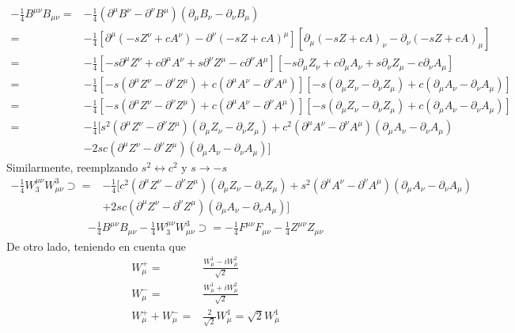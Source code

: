\begin{itemize}
\begin{align}
  -\tfrac{1}{4}B^{\mu\nu}B_{\mu\nu}=&-\tfrac{1}{4}(\partial^\mu B^\nu-\partial^\nu B^\mu)(\partial_\mu B_\nu-\partial_\nu B_\mu)\nonumber\\
=&-\tfrac{1}{4}[\partial^\mu (-s Z^\nu+ c A^\nu)-\partial^\nu (-s Z+ c A)^\mu][\partial_\mu (-s Z+ c A)_\nu-\partial_\nu (-s Z+ c A)_\mu]\nonumber\\
=&-\tfrac{1}{4}[-s\partial^\mu Z^\nu +c\partial^\mu A^\nu+s\partial^\nu Z^\mu-c\partial^\nu A^\mu][-s\partial_\mu Z_\nu +c\partial_\mu A_\nu+s\partial_\nu Z_\mu-c\partial_\nu A_\mu]\nonumber\\
=&-\tfrac{1}{4}[-s(\partial^\mu Z^\nu-\partial^\nu Z^\mu)+c(\partial^\mu A^\nu-\partial^\nu A^\mu)][-s(\partial_\mu Z_\nu-\partial_\nu Z_\mu)+c(\partial_\mu A_\nu-\partial_\nu A_\mu)]\nonumber\\
  =&-\tfrac{1}{4}[-s(\partial^\mu Z^\nu-\partial^\nu Z^\mu)+c(\partial^\mu A^\nu-\partial^\nu A^\mu)][-s(\partial_\mu Z_\nu-\partial_\nu Z_\mu)+c(\partial_\mu A_\nu-\partial_\nu A_\mu)]\nonumber\\
=&-\tfrac{1}{4}[s^2(\partial^\mu Z^\nu-\partial^\nu Z^\mu)(\partial_\mu Z_\nu-\partial_\nu Z_\mu)+c^2(\partial^\mu A^\nu-\partial^\nu A^\mu)(\partial_\mu A_\nu-\partial_\nu A_\mu)\nonumber\\
&  -2s c(\partial^\mu Z^\nu-\partial^\nu Z^\mu)(\partial_\mu A_\nu-\partial_\nu A_\mu)]
\end{align}
Similarmente, reemplzando $s^2\leftrightarrow c^2$ y $s\to-s$
\begin{align}
-\tfrac{1}{4}W^{\mu\nu}_3W_{\mu\nu}^3\supset=&-\tfrac{1}{4}[c^2(\partial^\mu Z^\nu-\partial^\nu Z^\mu)(\partial_\mu Z_\nu-\partial_\nu Z_\mu)+s^2(\partial^\mu A^\nu-\partial^\nu A^\mu)(\partial_\mu A_\nu-\partial_\nu A_\mu)\nonumber\\
&  +2s c(\partial^\mu Z^\nu-\partial^\nu Z^\mu)(\partial_\mu A_\nu-\partial_\nu A_\mu)]
\end{align}
\begin{align}
  -\tfrac{1}{4}B^{\mu\nu}B_{\mu\nu}-\tfrac{1}{4}W^{\mu\nu}_3W_{\mu\nu}^3\supset=-\tfrac{1}{4}F^{\mu\nu}F_{\mu\nu}-\tfrac{1}{4}Z^{\mu\nu}Z_{\mu\nu}
\end{align}
De otro lado, teniendo en cuenta que
\begin{align}
  W_\mu^+=&\frac{W_\mu^1-i W_\mu^2}{\sqrt{2}}\nonumber\\
  W_\mu^-=&\frac{W_\mu^1+i W_\mu^2}{\sqrt{2}}\nonumber\\
W_\mu^++W_\mu^-=&\frac{2}{\sqrt{2}}W_\mu^1=\sqrt{2}W_\mu^1\nonumber\\

\end{align}
\end{itemize}
